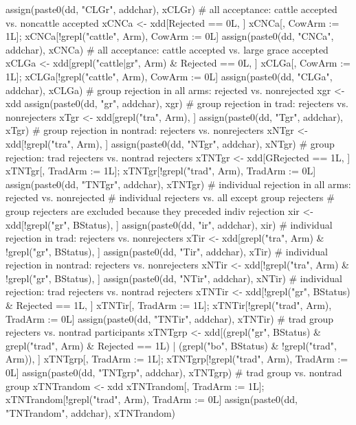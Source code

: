 \begin{Schunk}
\begin{Sinput}
{{    assign(paste0(dd, "CLGr", addchar), xCLGr)
    # all acceptance: cattle accepted vs. noncattle accepted
    xCNCa <- xdd[Rejected == 0L, ]
    xCNCa[, CowArm := 1L]; xCNCa[!grepl("cattle", Arm), CowArm := 0L]
    assign(paste0(dd, "CNCa", addchar), xCNCa)
    # all acceptance: cattle accepted vs. large grace accepted
    xCLGa <- xdd[grepl("cattle|gr", Arm) & Rejected == 0L, ]
    xCLGa[, CowArm := 1L]; xCLGa[!grepl("cattle", Arm), CowArm := 0L]
    assign(paste0(dd, "CLGa", addchar), xCLGa)
    # group rejection in all arms: rejected vs. nonrejected
    xgr <- xdd
    assign(paste0(dd, "gr", addchar), xgr)
    # group rejection in trad: rejecters vs. nonrejecters
    xTgr <- xdd[grepl("tra", Arm), ]
    assign(paste0(dd, "Tgr", addchar), xTgr)
    # group rejection in nontrad: rejecters vs. nonrejecters
    xNTgr <- xdd[!grepl("tra", Arm), ]
    assign(paste0(dd, "NTgr", addchar), xNTgr)
    # group rejection: trad rejecters vs. nontrad rejecters
    xTNTgr <- xdd[GRejected == 1L, ]
    xTNTgr[, TradArm := 1L]; xTNTgr[!grepl("trad", Arm), TradArm := 0L]
    assign(paste0(dd, "TNTgr", addchar), xTNTgr)
    # individual rejection in all arms: rejected vs. nonrejected
    # individual rejecters vs. all except group rejecters
    # group rejecters are excluded because they preceded indiv rejection
    xir <- xdd[!grepl("gr", BStatus), ]
    assign(paste0(dd, "ir", addchar), xir)
    # individual rejection in trad: rejecters vs. nonrejecters
    xTir <- xdd[grepl("tra", Arm) & !grepl("gr", BStatus), ]
    assign(paste0(dd, "Tir", addchar), xTir)
    # individual rejection in nontrad: rejecters vs. nonrejecters
    xNTir <- xdd[!grepl("tra", Arm) & !grepl("gr", BStatus), ]
    assign(paste0(dd, "NTir", addchar), xNTir)
    # individual rejection: trad rejecters vs. nontrad rejecters
    xTNTir <- xdd[!grepl("gr", BStatus) & Rejected == 1L, ]
    xTNTir[, TradArm := 1L]; xTNTir[!grepl("trad", Arm), TradArm := 0L]
    assign(paste0(dd, "TNTir", addchar), xTNTir)
    # trad group rejecters vs. nontrad participants
    xTNTgrp <- xdd[(grepl("gr", BStatus) & grepl("trad", Arm) & Rejected == 1L) |
      (grepl("bo", BStatus) & !grepl("trad", Arm)), ]
    xTNTgrp[, TradArm := 1L]; xTNTgrp[!grepl("trad", Arm), TradArm := 0L]
    assign(paste0(dd, "TNTgrp", addchar), xTNTgrp)
    # trad group vs. nontrad group
    xTNTrandom <- xdd
    xTNTrandom[, TradArm := 1L]; xTNTrandom[!grepl("trad", Arm), TradArm := 0L]
    assign(paste0(dd, "TNTrandom", addchar), xTNTrandom)
  }
}
\end{Sinput}
\end{Schunk}
